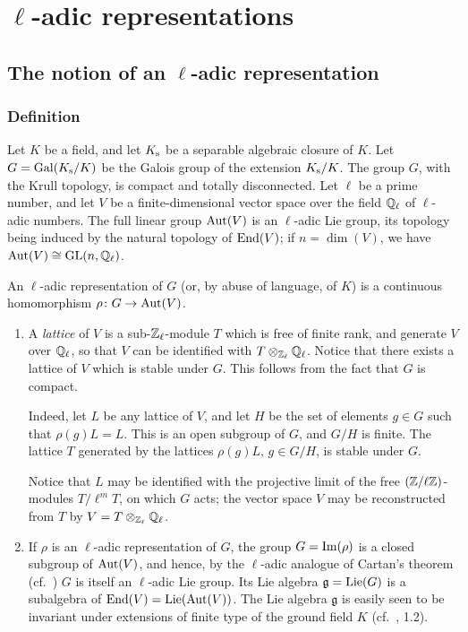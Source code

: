 \chapter{\texorpdfstring{$\ell$}{ℓ}-adic representations}%
\label{ch:i}

\section{The notion of an \texorpdfstring{$\ell$}{ℓ}-adic representation}
\subsection{Definition}\label{sec:I_11}
Let $K$ be a field,
\dpage
and let $K_{\mathrm{s}}$ be a separable algebraic closure of $K$.  Let $G =
\operatorname{Gal}(K_{\mathrm{s}} / K)$ be the Galois group of the extension $K_{\mathrm{s}}/K$.
The group $G$, with the Krull topology, is compact and totally disconnected.
Let $\ell$ be a prime number, and let $V$ be a finite-dimensional vector space
over the field $\mathbb{Q}_\ell$ of $\ell$-adic numbers.  The full linear group
$\operatorname{Aut}(V)$ is an $\ell$-adic Lie group, its topology being induced by the
natural topology of $\operatorname{End}(V)$; if $n = \dim(V)$, we have $\operatorname{Aut}(V) \cong \operatorname{GL}(n,
\mathbb{Q}_\ell)$.

\begin{mydef}
An $\ell$-adic representation of $G$ (or, by abuse of language, of $K$) is a
continuous homomorphism $\rho \colon G \to \operatorname{Aut}(V)$.
\end{mydef}

\begin{obs}
\begin{enumerate}
\item\label{rmk:I_11_1}
	A \emph{lattice} of $V$ is a sub-$\mathbb{Z}_\ell$-module $T$ which is free of
	finite rank, and generate $V$ over $\mathbb{Q}_\ell$, so that $V$ can be
	identified with $T \otimes_{\mathbb{Z}_\ell} \mathbb{Q}_\ell$.  Notice that there
	exists a lattice of $V$ which is stable under $G$. This follows from
	the fact that $G$ is compact.

	Indeed,
	\dpage
	let $L$ be any lattice of $V$, and let $H$ be the set of
	elements $g \in G$ such that $\rho(g)L = L$. This is an open
	subgroup of $G$, and $G/H$ is finite. The lattice $T$
	generated by the lattices $\rho(g)L$, $g \in G/H$, is stable
	under $G$.

	Notice that $L$ may be identified with the projective limit of
	the free $(\mathbb{Z}/\ell\mathbb{Z})$-modules $T/\ell^m T$, on which $G$
	acts; the vector space $V$ may be reconstructed from $T$ by $V
	= T \otimes_{\mathbb{Z}_\ell} \mathbb{Q}_\ell$.

\item If $\rho$ is an $\ell$-adic representation of $G$, the group $G
	= \operatorname{Im}(\rho)$ is a closed subgroup of $\operatorname{Aut}(V)$, and hence, by
	the $\ell$-adic analogue of Cartan's theorem (cf.\ 
	\cite[5-42]{28}) $G$ is itself an $\ell$-adic Lie group.
	Its Lie algebra $\mathfrak{g} = \operatorname{Lie}(G)$ is a subalgebra of
	$\operatorname{End}(V) = \operatorname{Lie}(\operatorname{Aut}(V))$. The Lie algebra $\mathfrak{g}$ is
	easily seen to be invariant under extensions of finite type of
	the ground field $K$ (cf.\ \cite{24}, 1.2).
\end{enumerate}
\end{obs}

